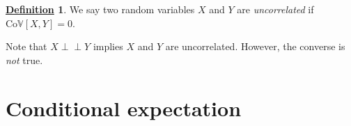\documentclass[12pt]{book}
\numberwithin{equation}{chapter}
\theoremstyle{plain}
\numberwithin{theorem}{section}
\theoremstyle{definition}
\newtheorem{definition}[theorem]{\underline{Definition}}
\numberwithin{exercise}{chapter}
\newcommand{\<}{\langle}
\renewcommand{\>}{\rangle}
\renewcommand{\(}{\left(}
\renewcommand{\)}{\right)}
\renewcommand{\[}{\left[}
\renewcommand{\]}{\right]}
\newcommand\Vb{\mathds{V}}
\newcommand{\ind}{\perp \! \! \! \perp}
\begin{document}
\begin{definition}
We say two random variables $X$ and $Y$ are \emph{uncorrelated} if $\text{Co}\Vb[X,Y]=0$.
\end{definition}

\noindent
Note that $X \ind Y$ implies $X$ and $Y$ are uncorrelated.  However, the converse is \emph{not} true.  


\section{Conditional expectation}
\end{document}
